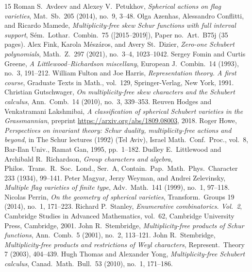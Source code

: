 \begin{thebibliography}{15}
 Roman S.~Avdeev and Alexey V.~Petukhov, \emph{Spherical actions on flag varieties}, Mat.\ Sb.\ 205 (2014), no.~9, 3--48.
 Olga Azenhas, Alessandro Conflitti, and Ricardo Mamede, \emph{Multiplicity-free skew Schur functions with full interval support}, S\'em.\ Lothar.\ Combin.\ 75 ([2015--2019]), Paper no.~Art.\ B75j (35 pages).
 Alex Fink, Karola M\'esz\'aros, and Avery St.\ Dizier, \emph{Zero-one Schubert polynomials}, Math.\ Z.\ 297 (2021), no.~3--4, 1023--1042.
 Sergey Fomin and Curtis Greene, \emph{A Littlewood--Richardson miscellany}, European J.\ Combin.\ 14 (1993), no.~3, 191--212.
 William Fulton and Joe Harris, \emph{Representation theory. A first course}, Graduate Texts in Math., vol.~129, Springer-Verlag, New York, 1991.
 Christian Gutschwager, \emph{On multiplicity-free skew characters and the Schubert calculus}, Ann.\ Comb.\ 14 (2010), no.~3, 339--353.
 Reuven Hodges and Venkatramani Lakshmibai, \emph{A classification of spherical Schubert varieties in the Grassmannian}, preprint \url{https://arxiv.org/abs/1809.08003}, 2018.
 Roger Howe, \emph{Perspectives on invariant theory: Schur duality, multiplicity-free actions and beyond}, in The Schur lectures (1992) (Tel Aviv), Israel Math.\ Conf.\ Proc., vol.~8, Bar-Ilan Univ., Ramat Gan, 1995, pp.~1--182.
 Dudley E.~Littlewood and Archibald R.~Richardson, \emph{Group characters and algebra}, Philos.\ Trans.\ R.\ Soc.\ Lond., Ser.\ A, Contain.\ Pap.\ Math.\ Phys.\ Character 233 (1934), 99--141.
 Peter Magyar, Jerzy Weyman, and Andrei Zelevinsky, \emph{Multiple flag varieties of finite type}, Adv.\ Math.\ 141 (1999), no.~1, 97--118.
 Nicolas Perrin, \emph{On the geometry of spherical varieties}, Transform.\ Groups 19 (2014), no.~1, 171--223.
 Richard P.~Stanley, \emph{Enumerative combinatorics. Vol.~2}, Cambridge Studies in Advanced Mathematics, vol.~62, Cambridge University Press, Cambridge, 2001.
 John R.~Stembridge, \emph{Multiplicity-free products of Schur functions}, Ann.\ Comb.\ 5 (2001), no.~2, 113--121.
 John R.~Stembridge, \emph{Multiplicity-free products and restrictions of Weyl characters}, Represent.\ Theory 7 (2003), 404--439.
 Hugh Thomas and Alexander Yong, \emph{Multiplicity-free Schubert calculus}, Canad.\ Math.\ Bull.\ 53 (2010), no.~1, 171--186.
\end{thebibliography}
